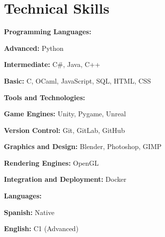 \section{Technical Skills}

\begin{onecolentry}
\textbf{Programming Languages:}
\begin{highlights}
\item \textbf{Advanced:} Python
\item \textbf{Intermediate:} C\#, Java, C++
\item \textbf{Basic:} C, OCaml, JavaScript, SQL, HTML, CSS
\end{highlights}
\end{onecolentry}

\vspace{0.2 cm}

\begin{onecolentry}
\textbf{Tools and Technologies:}
\begin{highlights}
\item \textbf{Game Engines:} Unity, Pygame, Unreal
\item \textbf{Version Control:} Git, GitLab, GitHub
\item \textbf{Graphics and Design:} Blender, Photoshop, GIMP
\item \textbf{Rendering Engines:} OpenGL
\item \textbf{Integration and Deployment:} Docker
\end{highlights}
\end{onecolentry}

\vspace{0.2 cm}

\begin{onecolentry}
\textbf{Languages:}
\begin{highlights}
\item \textbf{Spanish:} Native
\item \textbf{English:} C1 (Advanced)
\end{highlights}
\end{onecolentry}